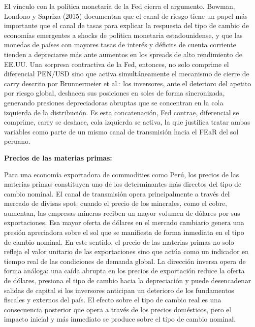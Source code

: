 ﻿\documentclass[11pt,a4paper]{article}
\begin{document}
El vínculo con la política monetaria de la Fed cierra el argumento. Bowman, Londono y Sapriza (2015) documentan que el canal de riesgo tiene un papel más importante que el canal de tasas para explicar la respuesta del tipo de cambio de economías emergentes a shocks de política monetaria estadounidense, y que las monedas de países con mayores tasas de interés y déficits de cuenta corriente tienden a depreciarse más ante aumentos en los spreads de alto rendimiento de EE.UU. Una sorpresa contractiva de la Fed, entonces, no solo comprime el diferencial PEN/USD sino que activa simultáneamente el mecanismo de cierre de carry descrito por Brunnermeier et al.: los inversores, ante el deterioro del apetito por riesgo global, deshacen sus posiciones en soles de forma sincronizada, generando presiones depreciadoras abruptas que se concentran en la cola izquierda de la distribución. Es esta concatenación, Fed contrae, diferencial se comprime, carry se deshace, cola izquierda se activa, la que justifica tratar ambas variables como parte de un mismo canal de transmisión hacia el FEaR del sol peruano.

\textbf{Precios de las materias primas:}

Para una economía exportadora de commodities como Perú, los precios de las materias primas constituyen uno de los determinantes más directos del tipo de cambio nominal. El canal de transmisión opera principalmente a través del mercado de divisas spot: cuando el precio de los minerales, como el cobre, aumentan, las empresas mineras reciben un mayor volumen de dólares por sus exportaciones. Esa mayor oferta de dólares en el mercado cambiario genera una presión apreciadora sobre el sol que se manifiesta de forma inmediata en el tipo de cambio nominal. En este sentido, el precio de las materias primas no solo refleja el valor unitario de las exportaciones sino que actúa como un indicador en tiempo real de las condiciones de demanda global. La dirección inversa opera de forma análoga: una caída abrupta en los precios de exportación reduce la oferta de dólares, presiona el tipo de cambio hacia la depreciación y puede desencadenar salidas de capital si los inversores anticipan un deterioro de los fundamentos fiscales y externos del país. El efecto sobre el tipo de cambio real es una consecuencia posterior que opera a través de los precios domésticos, pero el impacto inicial y más inmediato se produce sobre el tipo de cambio nominal.
\end{document}
